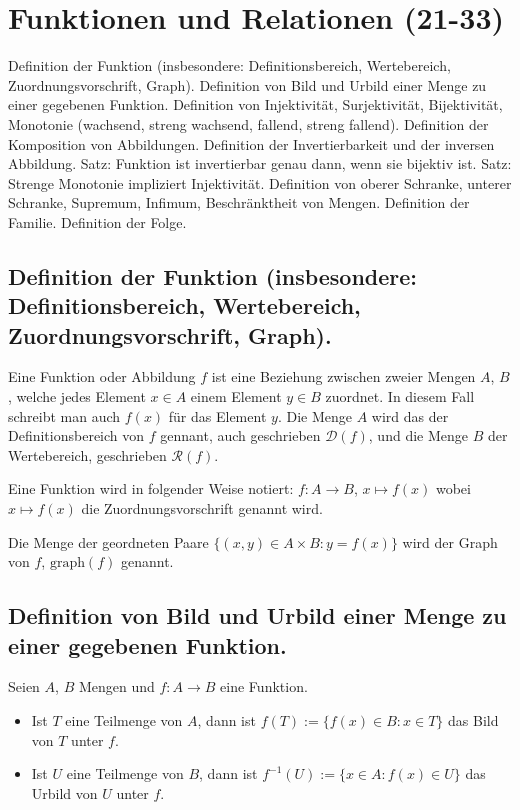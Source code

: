 \section{Funktionen und Relationen (21-33)}
Definition der Funktion (insbesondere: Definitionsbereich, Wertebereich, Zuordnungsvorschrift, Graph). Definition von Bild und Urbild einer Menge zu einer gegebenen Funktion. Definition von Injektivität, Surjektivität, Bijektivität, Monotonie (wachsend, streng wachsend, fallend, streng fallend). Definition der Komposition von Abbildungen. Definition der Invertierbarkeit und der inversen Abbildung. Satz: Funktion ist invertierbar genau dann, wenn sie bijektiv ist. Satz: Strenge Monotonie impliziert Injektivität. Definition von oberer Schranke, unterer Schranke, Supremum, Infimum, Beschränktheit von Mengen. Definition der Familie. Definition der Folge. 
\subsection{Definition der Funktion (insbesondere: Definitionsbereich, Wertebereich, Zuordnungsvorschrift, Graph).}
Eine Funktion oder Abbildung $f$ ist eine Beziehung zwischen zweier Mengen $A$, $B$, welche jedes Element $x \in A$ einem Element $y \in B$ zuordnet. In diesem Fall schreibt man auch $f(x)$ für das Element $y$. Die Menge $A$ wird das der Definitionsbereich von $f$ gennant, auch geschrieben $\mathcal{D}(f)$, und die Menge $B$ der Wertebereich, geschrieben $\mathcal{R}(f)$.
    
Eine Funktion wird in folgender Weise notiert: $f : A \longrightarrow B$, $x \mapsto f(x)$ wobei $x \mapsto f(x)$ die Zuordnungsvorschrift genannt wird. 

Die Menge der geordneten Paare $\{(x,y) \in A \times B : y = f(x)\}$ wird der Graph von $f$, $\text{graph}(f)$ genannt.

\subsection{Definition von Bild und Urbild einer Menge zu einer gegebenen Funktion.}
Seien $A$, $B$ Mengen und $f: A \longrightarrow B$ eine Funktion.

\begin{itemize}
\item Ist $T$ eine Teilmenge von $A$, dann ist $f(T) := \{f(x) \in B: x \in T \}$ das Bild von $T$ unter $f$.
\item Ist $U$ eine Teilmenge von $B$, dann ist $f^{-1}(U):= \{x \in A: f(x) \in U \}$ das Urbild von $U$ unter $f$.
\end{itemize}

